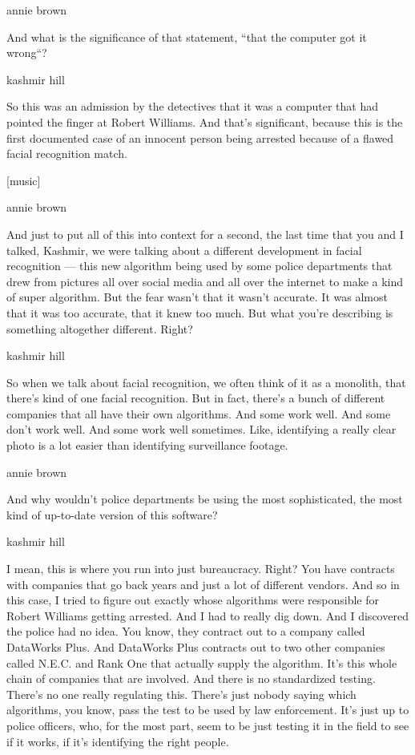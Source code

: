 annie brown

And what is the significance of that statement, ``that the computer got
it wrong``?

kashmir hill

So this was an admission by the detectives that it was a computer that
had pointed the finger at Robert Williams. And that's significant,
because this is the first documented case of an innocent person being
arrested because of a flawed facial recognition match.

{[}music{]}

annie brown

And just to put all of this into context for a second, the last time
that you and I talked, Kashmir, we were talking about a different
development in facial recognition --- this new algorithm being used by
some police departments that drew from pictures all over social media
and all over the internet to make a kind of super algorithm. But the
fear wasn't that it wasn't accurate. It was almost that it was too
accurate, that it knew too much. But what you're describing is something
altogether different. Right?

kashmir hill

So when we talk about facial recognition, we often think of it as a
monolith, that there's kind of one facial recognition. But in fact,
there's a bunch of different companies that all have their own
algorithms. And some work well. And some don't work well. And some work
well sometimes. Like, identifying a really clear photo is a lot easier
than identifying surveillance footage.

annie brown

And why wouldn't police departments be using the most sophisticated, the
most kind of up-to-date version of this software?

kashmir hill

I mean, this is where you run into just bureaucracy. Right? You have
contracts with companies that go back years and just a lot of different
vendors. And so in this case, I tried to figure out exactly whose
algorithms were responsible for Robert Williams getting arrested. And I
had to really dig down. And I discovered the police had no idea. You
know, they contract out to a company called DataWorks Plus. And
DataWorks Plus contracts out to two other companies called N.E.C. and
Rank One that actually supply the algorithm. It's this whole chain of
companies that are involved. And there is no standardized testing.
There's no one really regulating this. There's just nobody saying which
algorithms, you know, pass the test to be used by law enforcement. It's
just up to police officers, who, for the most part, seem to be just
testing it in the field to see if it works, if it's identifying the
right people.

